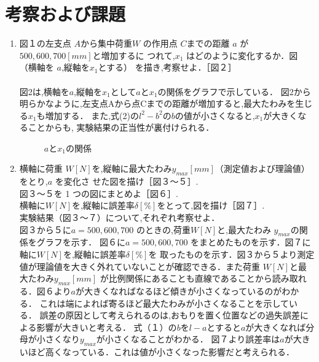\documentclass[a4paper,11pt]{jsarticle}
\begin{document}
\section{考察および課題}
\begin{enumerate}
  \item 図１の左支点 $A$から集中荷重$ W$ の作用点 $C $までの距離 $a$ が $500,600,700 [mm]$と増加するに
  つれて,$x_1$ はどのように変化するか．図（横軸を $a $,縦軸を$x_1$とする） を描き,考察せよ．［図２］\\
  \\
  \quad 図2は,横軸を$a$,縦軸を$x_1$として$a$と$x_1$の関係をグラフで示している．
  図2から明らかなように,左支点Aから点Cまでの距離が増加すると,最大たわみを生じる$x_1$も増加する．
  また,式(2)の$l^2-b^2$の$b$の値が小さくなると,$x_1$が大きくなることからも,
  実験結果の正当性が裏付けられる．
\clearpage
\begin{figure}[h]
  \centering
  \caption{$a$と$x_1$の関係}
\end{figure}
\clearpage
\item 横軸に荷重 $W [N] $を,縦軸に最大たわみ$ y_{max}[mm]$（測定値および理論値）をとり,$a$ を変化さ
せた図を描け［図３～５］.\\
図３～５を 1 つの図にまとめよ［図６］.\\
横軸に$ W [N]$を,縦軸に誤差率$ \delta [\%]$をとって,図を描け［図７］.\\
実験結果（図３～７）について,それぞれ考察せよ．\\
  
\quad 図３から５に$a = 500,600,700$ のときの,荷重$ W [N] $と,最大たわみ $y_{max}$の関係をグラフを示す．
図６に$a = 500,600,700$ をまとめたものを示す．図７に軸に$ W [N]$を,縦軸に誤差率$ \delta [\%]$を
取ったものを示す．図３から５より測定値が理論値を大きく外れていないことが確認できる．また荷重 $W [N] $と最大たわみ$ y_{max}[mm]$
が比例関係にあることも直線であることから読み取れる．図６より$a$が大きくなればなるほど傾きが小さくなっているのがわかる．
これは端によれば寄るほど最大たわみが小さくなることを示している．
誤差の原因として考えられるのは,おもりを置く位置などの過失誤差による影響が大きいと考える．
式（１）の$b$を$l-a$とすると$a$が大きくなれば分母が小さくなり$y_{max}$が小さくなることがわかる．
図７より誤差率は$a$が大きいほど高くなっている．これは値が小さくなった影響だと考えられる．


\end{enumerate}
\end{document}
